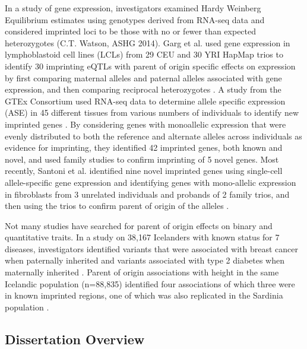 In a study of gene expression, investigators examined Hardy Weinberg Equilibrium estimates using genotypes derived from RNA-seq data and considered imprinted loci to be those with no or fewer than expected heterozygotes (C.T. Watson, ASHG 2014). Garg et al. used gene expression in lymphoblastoid cell lines (LCLs) from 29 CEU and 30 YRI HapMap trios to identify 30 imprinting eQTLs with parent of origin specific effects on expression by first comparing maternal alleles and paternal alleles associated with gene expression, and then comparing reciprocal heterozygotes \cite{Garg2012a}. A study from the GTEx Consortium used RNA-seq data to determine allele specific expression (ASE) in 45 different tissues from various numbers of individuals to identify new imprinted genes \cite{Baran:2015cx}. By considering genes with monoallelic expression that were evenly distributed to both the reference and alternate alleles across individuals as evidence for imprinting, they identified 42 imprinted genes, both known and novel, and used family studies to confirm imprinting of 5 novel genes. Most recently, Santoni et al. identified nine novel imprinted genes using single-cell allele-specific gene expression and identifying genes with mono-allelic expression in fibroblasts from 3 unrelated individuals and probands of 2 family trios, and then using the trios to confirm parent of origin of the alleles \cite{Santoni:2017hu}.

Not many studies have searched for parent of origin effects on binary and quantitative traits. In a study on 38,167 Icelanders with known status for 7 diseases, investigators identified variants that were associated with breast cancer when paternally inherited and variants associated with type 2 diabetes when maternally inherited \cite{Kong:2009kk}. Parent of origin associations with height in the same Icelandic population (n=88,835) identified four associations of which three were in known imprinted regions, one of which was also replicated in the Sardinia population \cite{Zoledziewska:2015do}.

\subsection{Dissertation Overview}

